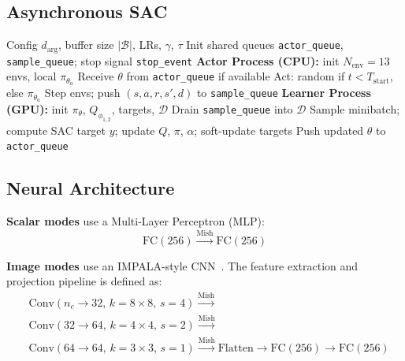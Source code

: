 \documentclass{article}
\begin{document}
\subsection{Asynchronous SAC}
\label{app:async_sac}

\begin{algorithm}[H]
\caption{Asynchronous SAC with Parallel Environments~\citep{liu2025asynchronous}}
\label{alg:async_sac}
\begin{algorithmic}[1]
\Require Config $d_\text{arg}$, buffer size $|\mathcal{B}|$, LRs, $\gamma$, $\tau$
\State Init shared queues \texttt{actor\_queue}, \texttt{sample\_queue};
       stop signal \texttt{stop\_event}
\State \textbf{Actor Process (CPU):} init $N_\text{env}=13$ envs, local $\pi_{\theta_a}$
  \State Receive $\theta$ from \texttt{actor\_queue} if available
  \State Act: random if $t\!<\!T_\text{start}$, else $\pi_{\theta_a}$
  \State Step envs; push $(s,a,r,s',d)$ to \texttt{sample\_queue}
\EndWhile
\State \textbf{Learner Process (GPU):} init $\pi_\theta$, $Q_{\phi_{1,2}}$, targets, $\mathcal{D}$
  \State Drain \texttt{sample\_queue} into $\mathcal{D}$
    \State Sample minibatch; compute SAC target $y$; update $Q$, $\pi$, $\alpha$;
           soft-update targets
  \EndFor
  \State Push updated $\theta$ to \texttt{actor\_queue}
\EndWhile
\end{algorithmic}
\end{algorithm}

\subsection{Neural Architecture}

\textbf{Scalar modes} use a Multi-Layer Perceptron (MLP):
\[
\mathrm{FC}(256) \xrightarrow{\text{Mish}} \mathrm{FC}(256)
\]

\textbf{Image modes} use an IMPALA-style CNN~\citep{espeholt2018impala}. The feature extraction and projection pipeline is defined as:
\begin{align*}
    &\mathrm{Conv}(n_c \to 32,\, k{=}8{\times}8,\, s{=}4) \xrightarrow{\text{Mish}} \\
    &\mathrm{Conv}(32 \to 64,\, k{=}4{\times}4,\, s{=}2) \xrightarrow{\text{Mish}} \\
    &\mathrm{Conv}(64 \to 64,\, k{=}3{\times}3,\, s{=}1) \xrightarrow{\text{Mish}} \mathrm{Flatten} \xrightarrow{} \mathrm{FC}(256) \xrightarrow{} \mathrm{FC}(256)
\end{align*}
\end{document}
